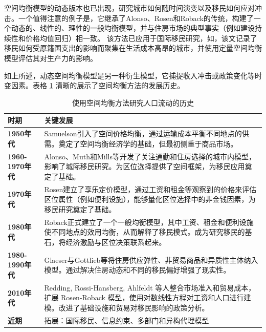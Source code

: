 \documentclass[a4paper,12pt,oneside, fontset=mac]{ctexbook} %
\begin{document}
空间均衡模型的动态版本也已出现，研究城市如何随时间演变以及移民如何应对冲击。一个值得注意的例子是\cite{glaeserHousingDynamicsUrban2014}，它继承了Alonso、Rosen和Roback的传统，构建了一个动态的、线性的、理性的一般均衡模型，并与住房市场的典型事实（例如建设持续性和价格均值回归）相一致。
该方法已应用于国际移民研究，如\cite{albertImmigrationSpatialEquilibrium2022}，该文记录了移民如何受原籍国支出的影响而聚集在生活成本高昂的城市，并使用定量空间均衡模型评估其对生产力的影响。

如上所述，动态空间均衡模型是另一种衍生模型，它捕捉收入冲击或政策变化等时变因素。表格 \ref{tab:_history of spatial equilibrium on migratory problem} 清晰的展示了空间均衡方法的发展历史。

\begin{table}[!ht]
\centering
\caption{使用空间均衡方法研究人口流动的历史}
\label{tab:_history of spatial equilibrium on migratory problem}
\begin{tabularx}{\textwidth}{@{}lX@{}}
\toprule
\textbf{时期} & \textbf{关键发展}\\
\midrule
\textbf{1950年代} & Samuelson引入了空间价格均衡，通过运输成本平衡不同地点的供需。奠定了空间均衡经济学的基础，但最初侧重于商品市场。\\
\textbf{1960-1970年代} & Alonso、Muth和Mills等开发了关注通勤和住房选择的城市内模型，影响了城际移民研究。为区位选择提供了空间框架，为移民应用奠定了基础。\\
\textbf{1970年代} & Rosen建立了享乐定价模型，通过工资和租金等观察到的价格来评估区位属性（例如便利设施），能够量化区位选择中的非金钱因素，为移民研究奠定了基础。 \\
\textbf{1980年代} & Roback正式建立了一个一般均衡模型，其中工资、租金和便利设施使不同地点的效用均衡，从而解释了移民模式。成为研究移民的基石，将经济激励与区位决策联系起来。\\
\textbf{1980-1990年代} & Glaeser与Gottlieb等将住房供应弹性、非贸易商品和异质性主体纳入模型。通过解决住房动态和不同的移民偏好增强了现实性。\\
\textbf{2010年代} & Redding, Rossi-Hansberg, Ahlfeldt 等人整合市场准入和贸易成本，扩展 Rosen-Roback 模型，使用对数线性方程对工资和人口进行建模。改进了基础设施和贸易对移民影响的政策分析。\\
\textbf{近期} & 拓展：国际移民、信息约束、多部门和异构代理模型 \\
\bottomrule
\end{tabularx}
\end{table}
\end{document}
